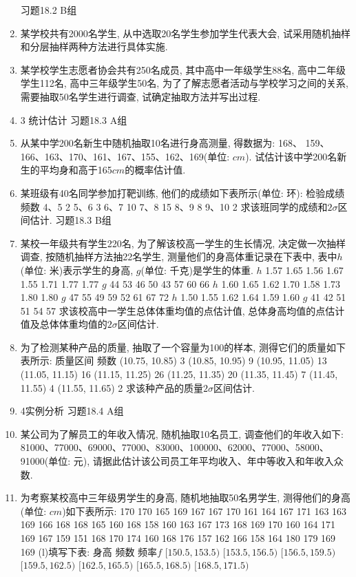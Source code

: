 \documentclass[10pt,a4paper]{article}
\begin{document}
\begin{enumerate}[1.]
习题18.2  B组
\item 某学校共有2000名学生, 从中选取20名学生参加学生代表大会, 试采用随机抽样和分层抽样两种方法进行具体实施.
\item 某学校学生志愿者协会共有250名成员, 其中高中一年级学生88名, 高中二年级学生112名, 高中三年级学生50名, 为了了解志愿者活动与学校学习之间的关系, 需要抽取50名学生进行调查, 试确定抽取方法并写出过程.
\item 3  统计估计
习题18.3   A组
\item 从某中学200名新生中随机抽取10名进行身高测量, 得数据为: 168、 159、166、163、170、161、167、155、162、169(单位: $cm$). 试估计该中学200名新生的平均身和高于165$cm$的概率估计值.
\item 某班级有40名同学参加打靶训练, 他们的成绩如下表所示(单位: 环):
检验成绩	频数
4、5	2
5、6	3
6、7	10
7、8	15
8、9	8
9、10	2
求该班同学的成绩和$2\sigma$区间估计.
习题18.3   B组
\item 某校一年级共有学生220名, 为了解该校高一学生的生长情况, 决定做一次抽样调查, 按随机抽样方法抽22名学生, 测量他们的身高体重记录在下表中, 表中$h$(单位: 米)表示学生的身高, $g$(单位: 千克)是学生的体重.
$h$	1.57	1.65	1.56	1.67	1.55	1.71	1.77	1.77
$g$	44	53	46	50	43	57	60	66
$h$	1.60	1.65	1.62	1.70	1.58	1.73	1.80	1.80
$g$	47	55	49	59	52	61	67	72
$h$	1.50	1.55	1.62	1.64	1.59	1.60		
$g$	41	42	51	51	54	57		
求该校高中一学生总体体重均值的点估计值, 总体身高均值的点估计值及总体体重均值的$2\sigma$区间估计.
\item 为了检测某种产品的质量, 抽取了一个容量为100的样本, 测得它们的质量如下表所示:
质量区间	频数
(10.75, 10.85)	3
(10.85, 10.95)	9
(10.95, 11.05)	13
(11.05, 11.15)	16
(11.15, 11.25)	26
(11.25, 11.35)	20
(11.35, 11.45)	7
(11.45, 11.55)	4
(11.55, 11.65)	2
求该种产品的质量$2\sigma$区间估计.
\item 4实例分析
习题18.4   A组
\item 某公司为了解员工的年收入情况, 随机抽取10名员工, 调查他们的年收入如下: 81000、77000、69000、77000、83000、100000、62000、77000、58000、91000(单位: 元), 请据此估计该公司员工年平均收入、年中等收入和年收入众数.
\item 为考察某校高中三年级男学生的身高, 随机地抽取50名男学生, 测得他们的身高(单位: $cm$)如下表所示:
170	170	165	169	167	167	170	161	164	167
171	163	163	169	166	168	168	165	160	168
158	160	163	167	173	168	169	170	160	164
171	169	167	159	151	168	170	174	160	168
176	157	162	166	158	164	180	179	169	169
(l)填写下表:
身高	频数	频率$f$
$[150.5,153.5)$		
$[153.5,156.5)$		
$[156.5,159.5)$		
$[159.5,162.5)$		
$[162.5,165.5)$		
$[165.5,168.5)$		
$[168.5,171.5)$		

\end{enumerate}
\end{document}
